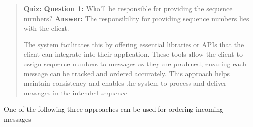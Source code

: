 \begin{quote}
\textbf{Quiz:}
\textbf{Question 1:} Who'll be responsible for providing the sequence numbers?
\textbf{Answer:} The responsibility for providing sequence numbers lies with the client.

The system facilitates this by offering essential libraries or APIs that the client can integrate into their application. These tools allow the client to assign sequence numbers to messages as they are produced, ensuring each message can be tracked and ordered accurately. This approach helps maintain consistency and enables the system to process and deliver messages in the intended sequence.
\end{quote}

One of the following three approaches can be used for ordering incoming messages:

